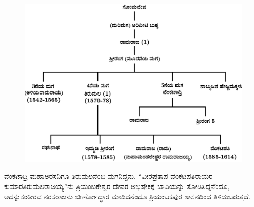 \newpage

\begin{figure}[H]
\includegraphics[scale=1.2]{images/chap3/chap3fig42.jpeg}
\end{figure}

ವೆಂಕಟಾದ್ರಿ ಮಹಾಅರಸನಿಗೂ ತಿರುಮಲನೆಂಬ ಮಗನಿದ್ದನು. “ವೀರಪ್ರತಾಪ ವೆಂಕಟಪತಿರಾಯರ ಕುಮಾರ\break ತಿರುಮಲರಾಜಯ್ಯ”ನು ತ್ರಿಯಂಬಕೇಶ್ವರ ದೇವರ ಅಭಿಷೇಕಕ್ಕೆ ಬಾವಿಯನ್ನು ತೋಡಿಸಿದ್ದನೆಂದೂ, ಅದನ್ನು\break ಕಂಠೀರವ ನರಸರಾಜನು ಜೀರ್ಣೋದ್ಧಾರ ಮಾಡಿದನೆಂದೂ ತ್ರಿಯಂಬಕಪುರ ಶಾಸನದಿಂದ ತಿಳಿದುಬರುತ್ತದೆ.

